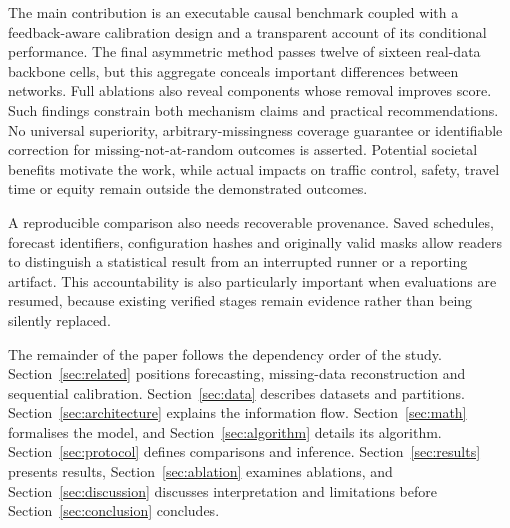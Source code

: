 The main contribution is an executable causal benchmark coupled with a feedback-aware calibration design and a transparent account of its conditional performance. The final asymmetric method passes twelve of sixteen real-data backbone cells, but this aggregate conceals important differences between networks. Full ablations also reveal components whose removal improves score. Such findings constrain both mechanism claims and practical recommendations. No universal superiority, arbitrary-missingness coverage guarantee or identifiable correction for missing-not-at-random outcomes is asserted. Potential societal benefits motivate the work, while actual impacts on traffic control, safety, travel time or equity remain outside the demonstrated outcomes.

A reproducible comparison also needs recoverable provenance. Saved schedules, forecast identifiers, configuration hashes and originally valid masks allow readers to distinguish a statistical result from an interrupted runner or a reporting artifact. This accountability is also particularly important when evaluations are resumed, because existing verified stages remain evidence rather than being silently replaced.

The remainder of the paper follows the dependency order of the study. Section~\ref{sec:related} positions forecasting, missing-data reconstruction and sequential calibration. Section~\ref{sec:data} describes datasets and partitions. Section~\ref{sec:architecture} explains the information flow. Section~\ref{sec:math} formalises the model, and Section~\ref{sec:algorithm} details its algorithm. Section~\ref{sec:protocol} defines comparisons and inference. Section~\ref{sec:results} presents results, Section~\ref{sec:ablation} examines ablations, and Section~\ref{sec:discussion} discusses interpretation and limitations before Section~\ref{sec:conclusion} concludes.
